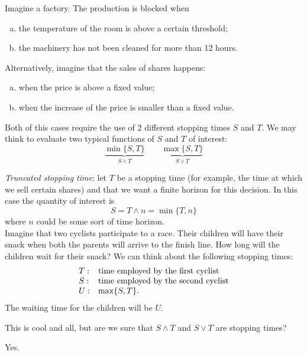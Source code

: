 \documentclass{report}
\begin{document}
\begin{example}
Imagine a factory. The production is blocked when
\begin{enumerate}[a)]
	\item the temperature of the room is above a certain threshold; 
	\item the machinery has not been cleaned for more than 12 hours.
\end{enumerate}\par
Alternatively, imagine that the sales of shares happens:
\begin{enumerate}[a)]
	\item when the price is above a fixed value;
	\item when the increase of the price is smaller than a fixed value.
\end{enumerate}
\end{example}
Both of this cases require the use of 2 different stopping times $S$ and $T$. We may think to evaluate two typical functions of $S$ and $T$ of interest:
\begin{equation*}
	\underbrace{\min\{S,T\}}_{S\wedge T}\qquad	\underbrace{\max\{S,T\}}_{S\vee T}
\end{equation*}
\begin{example}
	\emph{Truncated stopping time}: let $T$ be a stopping time (for example, the time at which we sell certain shares) and that we want a finite horizon for this decision. In this case the quantity of interest is
	\begin{equation*}
		S=T\wedge n=\min\{T,n\}
	\end{equation*}
	where $n$ could be some sort of time horizon.\\
	Imagine that two cyclists participate to a race. Their children will have their snack when both the parents will arrive to the finish line. How long will the children wait for their snack?
	We can think about the following stopping times:
\[ 	\begin{array}{l l}
		T: & \text{time employed by the first cyclist}\\
	S: & \text{time employed by the second cyclist}\\
	U: &\max\{S,T\}.
		
	\end{array} \]
	The waiting time for the children will be $U$.
\end{example}
This is cool and all, but are we sure that $S\wedge T$ and $S\vee T$ are stopping times?
\begin{remark}
	Yes.
\end{remark}
\end{document}
